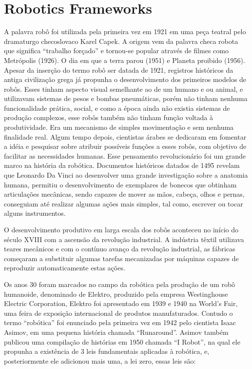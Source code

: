 \section{Robotics Frameworks}
\label{sec:robotic_frameworks}
A palavra robô foi utilizada pela primeira vez em 1921 em uma peça teatral pelo dramaturgo checoslovaco Karel Capek. A origem vem da palavra checa robota que significa “trabalho forçado” e tornou-se popular através de filmes como Metrópolis (1926). O dia em que a terra parou (1951) e Planeta proibido (1956). Apesar da inserção do termo robô ser datada de 1921, registros históricos da antiga civilização grega já propunha o desenvolvimento dos primeiros modelos de robôs. Esses tinham aspecto visual semelhante ao de um humano e ou animal, e utilizavam sistemas de pesos e bombas pneumáticas, porém não tinham nenhuma funcionalidade prática, social, e como a época ainda não existia sistemas de produção complexos, esse robôs também não tinham função voltada à produtividade. Era um mecanismo de simples movimentação e sem nenhuma finalidade real. Algum tempo depois, cientistas árabes se dedicaram em fomentar a idéia e pesquisar sobre atribuir possíveis funções a esses robôs, com objetivo de facilitar as necessidades humanas. Esse pensamento revolucionário foi um grande marco na história da robótica. Documentos históricos datados de 1495 revelam que Leonardo Da Vinci ao desenvolver uma grande investigação sobre a anatomia humana, permitiu o desenvolvimento de exemplares de bonecos que obtinham articulações mecânicas, sendo capazes de mover as mãos, cabeça, olhos e pernas, conseguiam até realizar algumas ações mais simples, tal como, escrever ou tocar alguns instrumentos.

O desenvolvimento produtivo em larga escala dos robôs aconteceu no início do século XVIII com a ascensão da revolução industrial. A indústria têxtil utilizava teares mecânicos e com o contínuo avanço da revolução industrial, as fábricas começaram a substituir algumas tarefas mecanizadas por máquinas capazes de reproduzir automaticamente estas ações.
  
Os anos 30 foram marcados no campo da robótica pela produção de um robô humanoide, denominado de Elektro, produzido pela empresa Westinghouse Electric Corporation, Elektro foi apresentado em 1939 e 1940 na World’s Fair,  uma feira de exposição internacional de produtos manufaturados. Contudo o termo “robótica” foi enunciado pela primeira vez em 1942 pelo cientista Isaac Asimov, em uma pequena história chamada “Runaround”. Asimov também publicou uma compilação de histórias em 1950 chamada “I Robot”, na qual ele propunha a existência de 3 leis fundamentais aplicadas à robótica, e, posteriormente ele adicionou mais uma, a lei zero, essas leis são:

